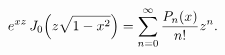 \[e^{xz}\mathop{J_{0}\/}\nolimits\!\left(z\sqrt{1-x^{2}}\right)=\sum_{n=0}^{%
\infty}\frac{\mathop{P_{n}\/}\nolimits\!\left(x\right)}{n!}z^{n}.\]